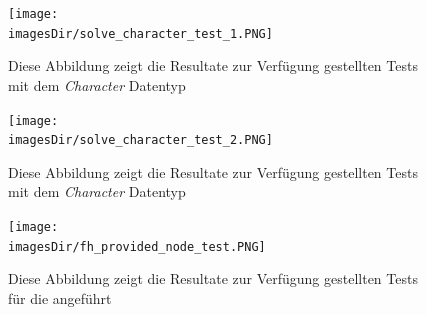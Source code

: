 \documentclass[11pt, a4paper, twoside]{article}   	%
\newcommand{\imagesDir}{images}
\begin{document}
\begin{figure}[h]
	\centering
	\texttt{[image: \\imagesDir/solve\_character\_test\_1.PNG]}
	\caption
	{Diese Abbildung zeigt die Resultate zur Verfügung gestellten Tests mit dem \emph{Character} Datentyp}
\end{figure}
\newpage

\begin{figure}[h]
	\centering
	\texttt{[image: \\imagesDir/solve\_character\_test\_2.PNG]}
	\caption
	{Diese Abbildung zeigt die Resultate zur Verfügung gestellten Tests mit dem \emph{Character} Datentyp}
\end{figure}
\newpage

\begin{figure}[h]
	\centering
	\texttt{[image: \\imagesDir/fh\_provided\_node\_test.PNG]}
	\caption
	{Diese Abbildung zeigt die Resultate zur Verfügung gestellten Tests für die  angeführt}
\end{figure}
\newpage
\end{document}
